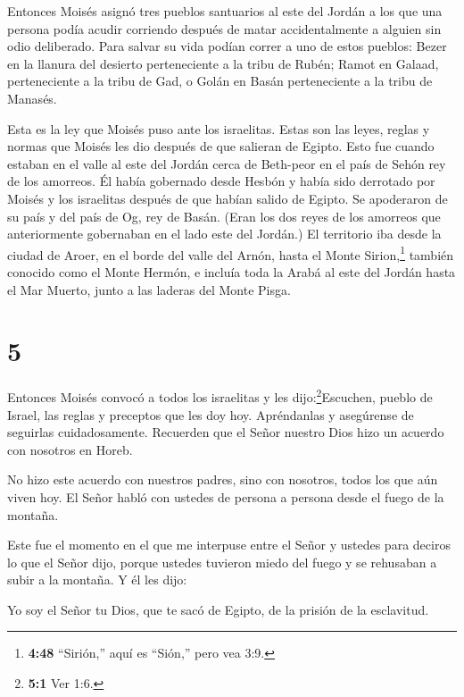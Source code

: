  Entonces Moisés asignó tres pueblos santuarios al este del
Jordán  a los que una persona podía acudir corriendo
después de matar accidentalmente a alguien sin odio deliberado. Para
salvar su vida podían correr a uno de estos pueblos:  Bezer
en la llanura del desierto perteneciente a la tribu de Rubén; Ramot en
Galaad, perteneciente a la tribu de Gad, o Golán en Basán perteneciente
a la tribu de Manasés.

 Esta es la ley que Moisés puso ante los israelitas.
 Estas son las leyes, reglas y normas que Moisés les dio
después de que salieran de Egipto.  Esto fue cuando estaban
en el valle al este del Jordán cerca de Beth-peor en el país de Sehón
rey de los amorreos. Él había gobernado desde Hesbón y había sido
derrotado por Moisés y los israelitas después de que habían salido de
Egipto.  Se apoderaron de su país y del país de Og, rey de
Basán. (Eran los dos reyes de los amorreos que anteriormente gobernaban
en el lado este del Jordán.)  El territorio iba desde la
ciudad de Aroer, en el borde del valle del Arnón, hasta el Monte
Sirion,\footnote{\textbf{4:48} ``Sirión,'' aquí es ``Sión,'' pero vea
  3:9.} también conocido como el Monte Hermón,  e incluía
toda la Arabá al este del Jordán hasta el Mar Muerto, junto a las
laderas del Monte Pisga.

\hypertarget{section-4}{%
\section{5}\label{section-4}}

 Entonces Moisés convocó a todos los israelitas y les
dijo:\footnote{\textbf{5:1} Ver 1:6.}Escuchen, pueblo de Israel, las
reglas y preceptos que les doy hoy. Apréndanlas y asegúrense de
seguirlas cuidadosamente.  Recuerden que el Señor nuestro
Dios hizo un acuerdo con nosotros en Horeb.

 No hizo este acuerdo con nuestros padres, sino con
nosotros, todos los que aún viven hoy.  El Señor habló con
ustedes de persona a persona desde el fuego de la montaña.

 Este fue el momento en el que me interpuse entre el Señor y
ustedes para deciros lo que el Señor dijo, porque ustedes tuvieron miedo
del fuego y se rehusaban a subir a la montaña. Y él les dijo:

 Yo soy el Señor tu Dios, que te sacó de Egipto, de la
prisión de la esclavitud.

